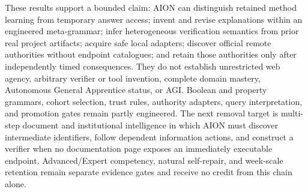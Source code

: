 These results support a bounded claim: AION can distinguish retained method
learning from temporary answer access; invent and revise explanations within an
engineered meta-grammar; infer heterogeneous verification semantics from prior
real project artifacts; acquire safe local adapters; discover official remote
authorities without endpoint catalogues; and retain those authorities only
after independently timed consequences.  They do not establish unrestricted
web agency, arbitrary verifier or tool invention, complete domain mastery,
Autonomous General Apprentice status, or AGI.  Boolean and property grammars,
cohort selection, trust rules, authority adapters, query interpretation, and
promotion gates remain partly engineered.  The next removal target is
multi-step document and institutional intelligence in which AION must discover
intermediate identifiers, follow dependent information actions, and construct
a verifier when no documentation page exposes an immediately executable
endpoint.  Advanced/Expert competency, natural self-repair, and week-scale
retention remain separate evidence gates and receive no credit from this chain
alone.
